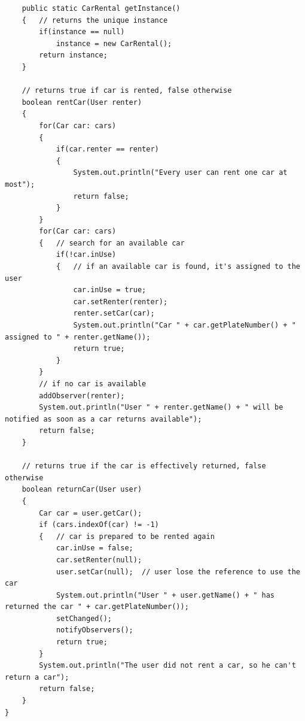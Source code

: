 \documentclass[]{article}
\begin{document}
\begin{lstlisting}
    public static CarRental getInstance()
    {   // returns the unique instance
        if(instance == null)
            instance = new CarRental();
        return instance;
    }

    // returns true if car is rented, false otherwise
    boolean rentCar(User renter)
    {
        for(Car car: cars)
        {
            if(car.renter == renter)
            {
                System.out.println("Every user can rent one car at most");
                return false;
            }
        }
        for(Car car: cars)
        {   // search for an available car
            if(!car.inUse)
            {   // if an available car is found, it's assigned to the user
                car.inUse = true;
                car.setRenter(renter);
                renter.setCar(car);
                System.out.println("Car " + car.getPlateNumber() + " assigned to " + renter.getName());
                return true;
            }
        }
        // if no car is available
        addObserver(renter);
        System.out.println("User " + renter.getName() + " will be notified as soon as a car returns available");
        return false;
    }

    // returns true if the car is effectively returned, false otherwise
    boolean returnCar(User user)
    {
        Car car = user.getCar();
        if (cars.indexOf(car) != -1)
        {   // car is prepared to be rented again
            car.inUse = false;
            car.setRenter(null);
            user.setCar(null);  // user lose the reference to use the car
            System.out.println("User " + user.getName() + " has returned the car " + car.getPlateNumber());
            setChanged();
            notifyObservers();
            return true;
        }
        System.out.println("The user did not rent a car, so he can't return a car");
        return false;
    }
}

\end{lstlisting}
\end{document}
